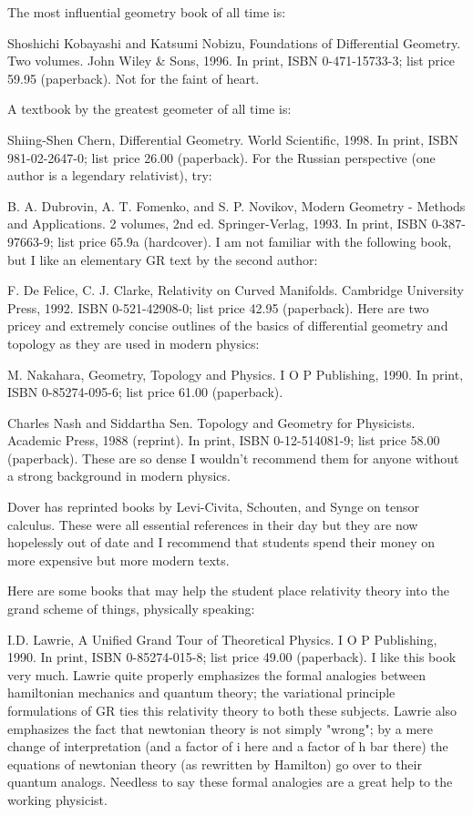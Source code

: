 \documentclass[10pt,a4paper]{book}
\theoremstyle{definition}
\begin{document}
The most influential geometry book of all time is:

Shoshichi Kobayashi and Katsumi Nobizu,
Foundations of Differential Geometry.  Two volumes.
John Wiley \& Sons, 1996.
In print, ISBN 0-471-15733-3; list price 59.95 (paperback).
Not for the faint of heart.

A textbook by the greatest geometer of all time is:

Shiing-Shen Chern,
Differential Geometry.
World Scientific, 1998.
In print, ISBN 981-02-2647-0; list price 26.00 (paperback).
For the Russian perspective (one author is a legendary relativist), try:

B. A. Dubrovin, A. T. Fomenko, and S. P. Novikov,
Modern Geometry - Methods and Applications.  2 volumes, 2nd ed.
Springer-Verlag, 1993.
In print, ISBN 0-387-97663-9; list price 65.9a (hardcover).
I am not familiar with the following book, but I like an elementary GR text by the second author:

F. De Felice, C. J. Clarke,
Relativity on Curved Manifolds.
Cambridge University Press, 1992.
ISBN 0-521-42908-0; list price 42.95 (paperback).
Here are two pricey and extremely concise outlines of the basics of differential geometry and topology as they are used in modern physics:

M. Nakahara,
Geometry, Topology and Physics.
I O P Publishing, 1990.
In print, ISBN 0-85274-095-6; list price 61.00 (paperback).

Charles Nash and Siddartha Sen.
Topology and Geometry for Physicists.
Academic Press, 1988 (reprint).
In print, ISBN 0-12-514081-9; list price 58.00 (paperback).
These are so dense I wouldn't recommend them for anyone without a strong background in modern physics.

Dover has reprinted books by Levi-Civita, Schouten, and Synge on tensor calculus.  These were all essential references in their day but they are now hopelessly out of date and I recommend that students spend their money on more expensive but more modern texts.

Here are some books that may help the student place relativity theory into the grand scheme of things, physically speaking:

I.D. Lawrie,
A Unified Grand Tour of Theoretical Physics.
I O P Publishing, 1990.
In print, ISBN 0-85274-015-8; list price 49.00 (paperback).
I like this book very much.  Lawrie quite properly emphasizes the formal analogies between hamiltonian mechanics and quantum theory; the variational principle formulations of GR ties this relativity theory to both these subjects.  Lawrie also emphasizes the fact that newtonian theory is not simply "wrong"; by a mere change of interpretation (and a factor of i here and a factor of h bar there) the equations of newtonian theory (as rewritten by Hamilton) go over to their quantum analogs.  Needless to say these formal analogies are a great help to the working physicist.
\end{document}
